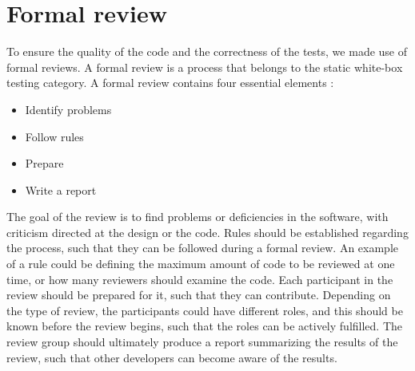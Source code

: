 \section{Formal review}
To ensure the quality of the code and the correctness of the tests, we made use of formal reviews.
A formal review is a process that belongs to the static white-box testing category.
A formal review contains four essential elements \cite{SoftwareTesting}:
\begin{itemize}\label{formalreview}
    \item Identify problems
    \item Follow rules
    \item Prepare
    \item Write a report
\end{itemize}
The goal of the review is to find problems or deficiencies in the software, with criticism directed at the design or the code.
Rules should be established regarding the process, such that they can be followed during a formal review.
An example of a rule could be defining the maximum amount of code to be reviewed at one time, or how many reviewers should examine the code.
Each participant in the review should be prepared for it, such that they can contribute.
Depending on the type of review, the participants could have different roles, and this should be known before the review begins, such that the roles can be actively fulfilled.
The review group should ultimately produce a report summarizing the results of the review, such that other developers can become aware of the results. 

